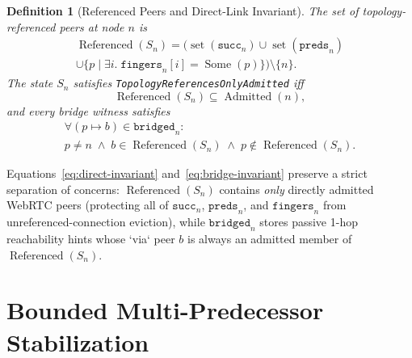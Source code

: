 \documentclass[journal]{IEEEtran}
\newtheorem{definition}{Definition}
\newcommand{\Admitted}{\operatorname{Admitted}}
\newcommand{\Referenced}{\operatorname{Referenced}}
\begin{document}
\begin{definition}[Referenced Peers and Direct-Link Invariant]
The set of topology-referenced peers at node $n$ is
\begin{multline}
  \Referenced(S_n) = \bigl(\operatorname{set}(\texttt{succ}_n) \cup
  \operatorname{set}(\texttt{preds}_n)\\
  \cup \{p \mid \exists i.\; \texttt{fingers}_n[i] = \operatorname{Some}(p)\}\bigr)
  \setminus \{n\}.
\end{multline}
The state $S_n$ satisfies \texttt{TopologyReferencesOnlyAdmitted} iff
\begin{equation}
  \Referenced(S_n) \subseteq \Admitted(n),
  \label{eq:direct-invariant}
\end{equation}
and every bridge witness satisfies
\begin{multline}
  \forall (p \mapsto b) \in \texttt{bridged}_n:\\
  p \neq n \;\land\; b \in \Referenced(S_n) \;\land\; p \notin \Referenced(S_n).
  \label{eq:bridge-invariant}
\end{multline}
\end{definition}

Equations~\eqref{eq:direct-invariant} and~\eqref{eq:bridge-invariant} preserve a
strict separation of concerns: $\Referenced(S_n)$ contains \emph{only} directly
admitted WebRTC peers (protecting all of $\texttt{succ}_n$, $\texttt{preds}_n$,
and $\texttt{fingers}_n$ from unreferenced-connection eviction), while
$\texttt{bridged}_n$ stores passive 1-hop reachability hints whose `via` peer
$b$ is always an admitted member of $\Referenced(S_n)$.

\section{Bounded Multi-Predecessor Stabilization}
\end{document}
